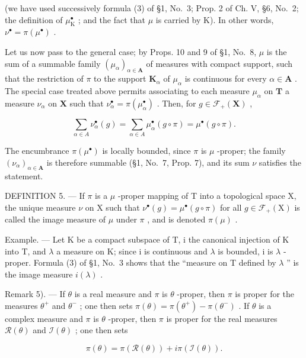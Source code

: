 (we have used successively formula (3) of §1, No.~3; Prop. 2 of Ch. V, §6, No.~2; the definition of \(\mu_{\mathrm{K}}^{\bullet}\) ; and the fact that \(\mu\) is carried by K). In other words, \(\nu^{\bullet} = \pi(\mu^{\bullet})\) .

Let us now pass to the general case; by Props. 10 and 9 of §1, No.~8, \(\mu\) is the sum of a summable family \((\mu_{\alpha})_{\alpha \in \mathbf{A}}\) of measures with compact support, such that the restriction of \(\pi\) to the support \(\mathbf{K}_{\alpha}\) of \(\mu_{\alpha}\) is continuous for every \(\alpha \in \mathbf{A}\) . The special case treated above permits associating to each measure \(\mu_{\alpha}\) on \(\mathbf{T}\) a measure \(\nu_{\alpha}\) on \(\mathbf{X}\) such that \(\nu_{\alpha}^{\bullet} = \pi (\mu_{\alpha}^{\bullet})\) . Then, for \(g \in \mathcal{F}_{+}(\mathbf{X})\) ,

\[
\sum_ {\alpha \in A} \nu_ {\alpha} ^ {\bullet} (g) = \sum_ {\alpha \in A} \mu_ {\alpha} ^ {\bullet} (g \circ \pi) = \mu^ {\bullet} (g \circ \pi).
\]

The encumbrance \(\pi (\mu^{\bullet})\) is locally bounded, since \(\pi\) is \(\mu\) -proper; the family \((\nu_{\alpha})_{\alpha \in \mathbf{A}}\) is therefore summable (§1, No.~7, Prop. 7), and its sum \(\nu\) satisfies the statement.

DEFINITION 5. --- If \(\pi\) is a \(\mu\) -proper mapping of T into a topological space X, the unique measure \(\nu\) on X such that \(\nu^{\bullet}(g) = \mu^{\bullet}(g \circ \pi)\) for all \(g \in \mathcal{F}_{+}(\mathrm{X})\) is called the image measure of \(\mu\) under \(\pi\) , and is denoted \(\pi(\mu)\) .

Example. --- Let K be a compact subspace of T, i the canonical injection of K into T, and \(\lambda\) a measure on K; since i is continuous and \(\lambda\) is bounded, i is \(\lambda\) -proper. Formula (3) of §1, No.~3 shows that the ``measure on T defined by \(\lambda\) '' is the image measure \(i(\lambda)\) .

Remark 5). --- If \(\theta\) is a real measure and \(\pi\) is \(\theta\) -proper, then \(\pi\) is proper for the measures \(\theta^{+}\) and \(\theta^{-}\) ; one then sets \(\pi(\theta) = \pi(\theta^{+}) - \pi(\theta^{-})\) . If \(\theta\) is a complex measure and \(\pi\) is \(\theta\) -proper, then \(\pi\) is proper for the real measures \(\mathcal{R}(\theta)\) and \(\mathcal{I}(\theta)\) ; one then sets

\[
\pi (\theta) = \pi (\mathcal {R} (\theta)) + i \pi (\mathcal {I} (\theta)).
\]

